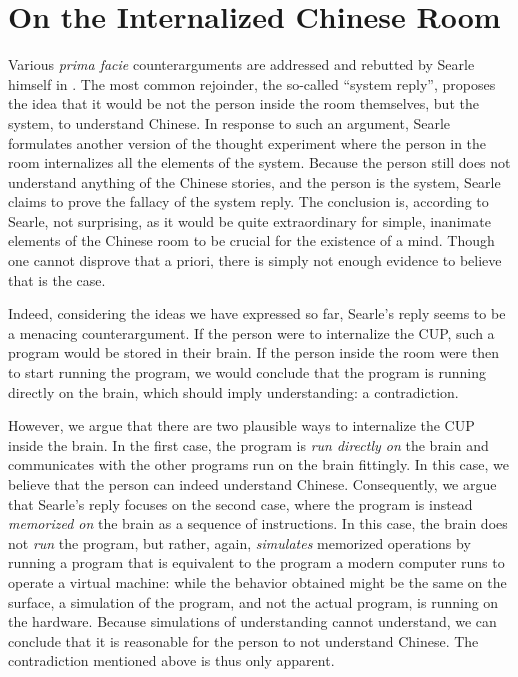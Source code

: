 \section{On the Internalized Chinese Room}

Various \textit{prima facie} counterarguments are addressed and rebutted by Searle himself in \cite{searle1980minds}. The most common rejoinder, the so-called ``system reply'', proposes the idea that it would be not the person inside the room themselves, but the system, to understand Chinese. In response to such an argument, Searle formulates another version of the thought experiment where the person in the room internalizes all the elements of the system. Because the person still does not understand anything of the Chinese stories, and the person is the system, Searle claims to prove the fallacy of the system reply. The conclusion is, according to Searle, not surprising, as it would be quite extraordinary for simple, inanimate elements of the Chinese room to be crucial for the existence of a mind. Though one cannot disprove that a priori, there is simply not enough evidence to believe that is the case.

Indeed, considering the ideas we have expressed so far, Searle's reply seems to be a menacing counterargument. If the person were to internalize the CUP, such a program would be stored in their brain. If the person inside the room were then to start running the program, we would conclude that the program is running directly on the brain, which should imply understanding: a contradiction.

However, we argue that there are two plausible ways to internalize the CUP inside the brain. In the first case, the program is \textit{run directly on} the brain and communicates with the other programs run on the brain fittingly. In this case, we believe that the person can indeed understand Chinese. Consequently, we argue that Searle's reply focuses on the second case, where the program is instead \textit{memorized on} the brain as a sequence of instructions. In this case, the brain does not \textit{run} the program, but rather, again, \textit{simulates} memorized operations by running a program that is equivalent to the program a modern computer runs to operate a virtual machine: while the behavior obtained might be the same on the surface, a simulation of the program, and not the actual program, is running on the hardware. Because simulations of understanding cannot understand, we can conclude that it is reasonable for the person to not understand Chinese. The contradiction mentioned above is thus only apparent. 
